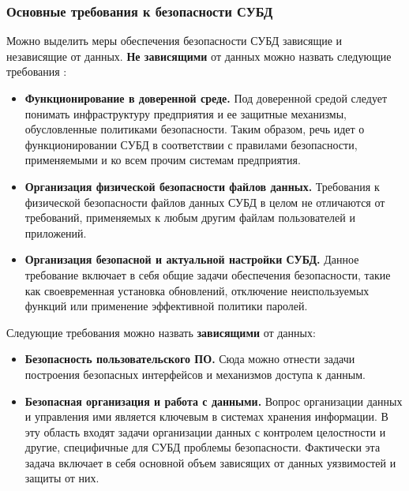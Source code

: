 \subsubsection{Основные требования к безопасности СУБД}
Можно выделить меры обеспечения безопасности СУБД зависящие и независящие от данных.
\textbf{Не зависящими} от данных можно назвать следующие требования \autocite{LAPA}:
\begin{itemize}
    \item \textbf{Функционирование в доверенной среде.}
    Под доверенной средой следует понимать инфраструктуру предприятия и ее защитные механизмы,
    обусловленные политиками безопасности. Таким образом, речь идет о функционировании СУБД в
    соответствии с правилами безопасности, применяемыми и ко всем прочим системам предприятия.

    \item \textbf{Организация физической безопасности файлов данных.}
    Требования к физической безопасности файлов данных СУБД в целом не отличаются от требований,
    применяемых к любым другим файлам пользователей и приложений.

    \item \textbf{Организация безопасной и актуальной настройки СУБД.}
    Данное требование включает в себя общие задачи обеспечения безопасности, такие как своевременная
    установка обновлений, отключение неиспользуемых функций или применение эффективной политики паролей.
\end{itemize}
Следующие требования можно назвать \textbf{зависящими} от данных:
\begin{itemize}
    \item \textbf{Безопасность пользовательского ПО.}
    Сюда можно отнести задачи построения безопасных интерфейсов и механизмов доступа к данным.
    \item \textbf{Безопасная организация и работа с данными.}
    Вопрос организации данных и управления ими является ключевым в системах хранения информации.
    В эту область входят задачи организации данных с контролем целостности и другие, специфичные
    для СУБД проблемы безопасности. Фактически эта задача включает в себя основной объем зависящих
    от данных уязвимостей и защиты от них.
\end{itemize}

